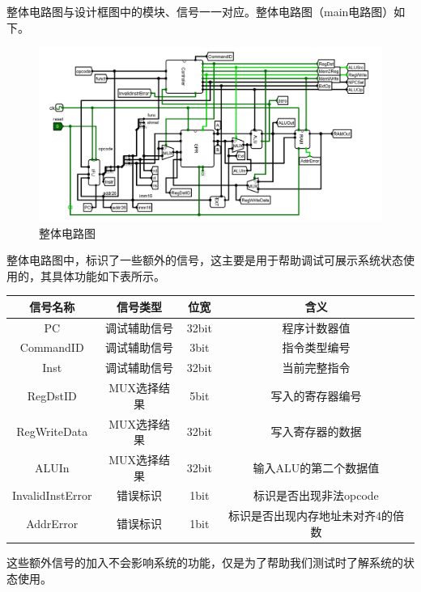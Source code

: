 \documentclass[main.tex]{subfiles}
\begin{document}
整体电路图与设计框图中的模块、信号一一对应。整体电路图（main电路图）如下。

\begin{figure}[h]
\centering
\includegraphics[width=\textwidth]{images/overall-circuit.png}
\caption{整体电路图}
\end{figure}

整体电路图中，标识了一些额外的信号，这主要是用于帮助调试可展示系统状态使用的，其具体功能如下表所示。

\begin{center}
    \begin{tabular}{c c c c}
        \toprule
        信号名称 & 信号类型 & 位宽 & 含义\\
        \midrule
        PC & 调试辅助信号 & 32bit & 程序计数器值 \\
        CommandID & 调试辅助信号 & 3bit & 指令类型编号 \\
        Inst & 调试辅助信号 & 32bit & 当前完整指令 \\
        RegDstID & MUX选择结果 & 5bit & 写入的寄存器编号 \\
        RegWriteData & MUX选择结果 & 32bit & 写入寄存器的数据 \\
        ALUIn & MUX选择结果 & 32bit & 输入ALU的第二个数据值 \\
        InvalidInstError & 错误标识 & 1bit & 标识是否出现非法opcode \\
        AddrError & 错误标识 & 1bit & 标识是否出现内存地址未对齐4的倍数 \\
        \bottomrule
    \end{tabular}
\end{center}

这些额外信号的加入不会影响系统的功能，仅是为了帮助我们测试时了解系统的状态使用。
\end{document}
